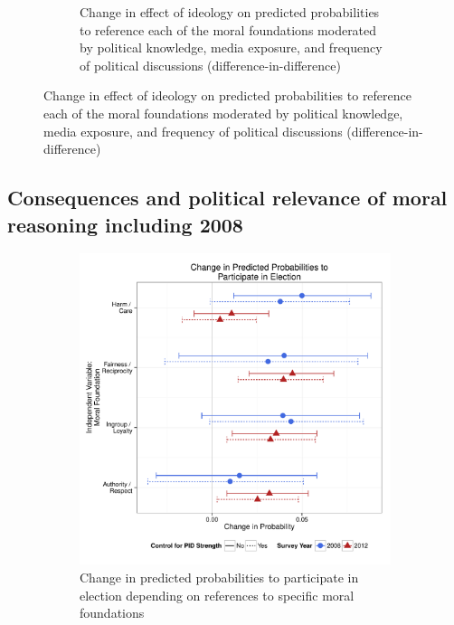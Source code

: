 \documentclass[12pt]{article}
\begin{document}
\begin{figure}[h]
\begin{subfigure}[t]{0.49\textwidth}
    \caption{Change in effect of ideology on predicted probabilities to reference each of the moral foundations moderated by political knowledge, media exposure, and frequency of political discussions (difference-in-difference)}\label{fig:appD8ideolearn}
  \end{subfigure}
\end{figure}


\clearpage
\subsection{Consequences and political relevance of moral reasoning including 2008}

\begin{figure}[h]
  \centering
  \caption{INSERT DESCRIPTION}
  \begin{subfigure}[t]{0.49\textwidth}
    \includegraphics[scale=.35]{../calc/fig/appD9turnout.pdf}
    \caption{Change in predicted probabilities to participate in election depending on references to specific moral foundations}\label{fig:appD9turnout}
  \end{subfigure}
  \begin{subfigure}[t]{0.49\textwidth}

\end{subfigure}
\end{figure}
\end{document}
